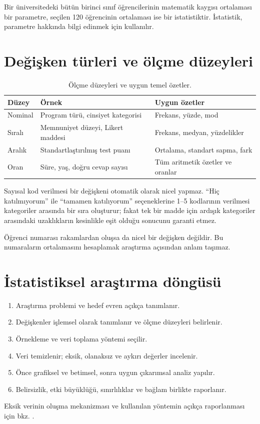 Bir üniversitedeki bütün birinci sınıf öğrencilerinin matematik kaygısı
ortalaması bir parametre, seçilen 120 öğrencinin ortalaması ise bir
istatistiktir. İstatistik, parametre hakkında bilgi edinmek için kullanılır.

\section{Değişken türleri ve ölçme düzeyleri}
\label{sec:research-variable-types}

\begin{table}[H]
\centering
\caption{Ölçme düzeyleri ve uygun temel özetler.}
\label{tab:measurement-levels}
\begin{tabular}{p{}p{}p{}}
\toprule
Düzey & Örnek & Uygun özetler \\
\midrule
Nominal & Program türü, cinsiyet kategorisi & Frekans, yüzde, mod \\
Sıralı & Memnuniyet düzeyi, Likert maddesi & Frekans, medyan, yüzdelikler \\
Aralık & Standartlaştırılmış test puanı & Ortalama, standart sapma, fark \\
Oran & Süre, yaş, doğru cevap sayısı & Tüm aritmetik özetler ve oranlar \\
\bottomrule
\end{tabular}
\end{table}

Sayısal kod verilmesi bir değişkeni otomatik olarak nicel yapmaz. ``Hiç
katılmıyorum'' ile ``tamamen katılıyorum'' seçeneklerine 1--5 kodlarının
verilmesi kategoriler arasında bir sıra oluşturur; fakat tek bir madde için
ardışık kategoriler arasındaki uzaklıkların kesinlikle eşit olduğu sonucunu
garanti etmez.

\begin{mistakebox}
Öğrenci numarası rakamlardan oluşsa da nicel bir değişken değildir. Bu
numaraların ortalamasını hesaplamak araştırma açısından anlam taşımaz.
\end{mistakebox}

\section{İstatistiksel araştırma döngüsü}
\label{sec:research-cycle}

\begin{enumerate}
  \item Araştırma problemi ve hedef evren açıkça tanımlanır.
  \item Değişkenler işlemsel olarak tanımlanır ve ölçme düzeyleri belirlenir.
  \item Örnekleme ve veri toplama yöntemi seçilir.
  \item Veri temizlenir; eksik, olanaksız ve aykırı değerler incelenir.
  \item Önce grafiksel ve betimsel, sonra uygun çıkarımsal analiz yapılır.
  \item Belirsizlik, etki büyüklüğü, sınırlılıklar ve bağlam birlikte raporlanır.
\end{enumerate}
Eksik verinin oluşma mekanizması ve kullanılan yöntemin açıkça raporlanması
için bkz. \citet{little2019}.

